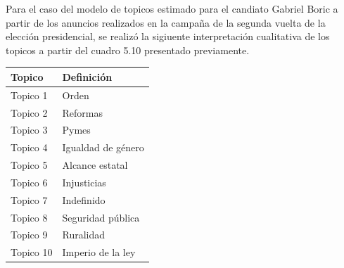 \documentclass[
  10pt,
  letterpaper,
]{report}
\begin{document}
Para el caso del modelo de topicos estimado para el candiato Gabriel
Boric a partir de los anuncios realizados en la campaña de la segunda
vuelta de la elección presidencial, se realizó la sigiuente
interpretación cualitativa de los topicos a partir del cuadro 5.10
presentado previamente.

\begin{longtable}[]{@{}ll@{}}
\toprule()
Topico & Definición \\
\midrule()
\endhead
Topico 1 & Orden \\
Topico 2 & Reformas \\
Topico 3 & Pymes \\
Topico 4 & Igualdad de género \\
Topico 5 & Alcance estatal \\
Topico 6 & Injusticias \\
Topico 7 & Indefinido \\
Topico 8 & Seguridad pública \\
Topico 9 & Ruralidad \\
Topico 10 & Imperio de la ley \\
\bottomrule()
\end{longtable}
\end{document}
